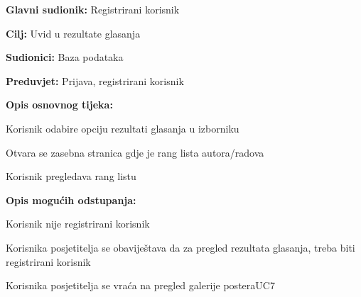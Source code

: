 					\noindent {}
					\begin{packed_item}
						
						\item \textbf{Glavni sudionik: }Registrirani korisnik
						\item  \textbf{Cilj:} Uvid u rezultate glasanja
						\item  \textbf{Sudionici:} Baza podataka
						\item  \textbf{Preduvjet:} Prijava, registrirani korisnik
						\item  \textbf{Opis osnovnog tijeka:}
						
						\item[] \begin{packed_enum}
							
							\item Korisnik odabire opciju rezultati glasanja u izborniku
							\item Otvara se zasebna stranica gdje je rang lista autora/radova
							\item Korisnik pregledava rang listu
						\end{packed_enum}
						
						\item  \textbf{Opis mogućih odstupanja:}
						
						\item[] \begin{packed_item}
							
							\item[1.a] Korisnik nije registrirani korisnik
							\item[] \begin{packed_enum}
								
								\item Korisnika posjetitelja se obaviještava da za pregled rezultata glasanja, treba biti registrirani korisnik
								\item Korisnika posjetitelja se vraća na pregled galerije postera{UC7}
								
							\end{packed_enum}
							
						\end{packed_item}
					\end{packed_item}
					
